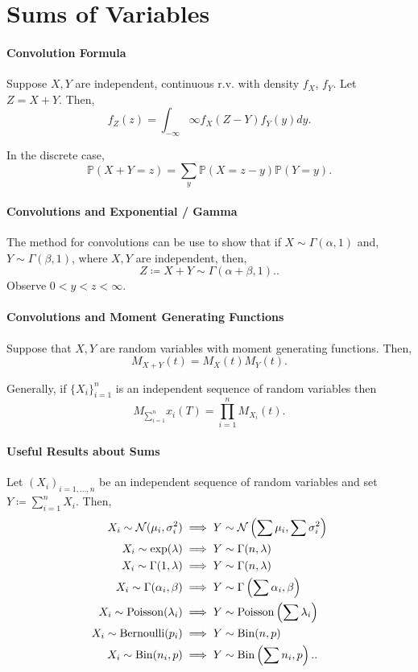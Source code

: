\section{Sums of Variables}

\paragraph{Convolution Formula}
Suppose \( X, Y \) are independent, continuous r.v. with density  \( f_X \),
\( f_Y \). Let \( Z = X + Y \). Then,  \[
    f_Z(z) = \int_{-\infty}{\infty} f_X(Z - Y) f_Y(y) dy
.\]

In the discrete case, \[
    \mathbb{P}(X + Y = z) = \sum_{y} \mathbb{P}(X = z - y) \mathbb{P}(Y = y)
.\]

\paragraph{Convolutions and Exponential / Gamma}
The method for convolutions can be use to show that if
\( X \sim \Gamma(\alpha , 1) \) and, \( Y \sim \Gamma(\beta, 1) \),
where \( X, Y \) are independent, then, \[
    Z \coloneqq X + Y \sim \Gamma(\alpha  + \beta, 1).
.\]
Observe \( 0 < y < z < \infty \).

\paragraph{Convolutions and Moment Generating Functions}
Suppose that \( X, Y \) are random variables with moment
generating functions. Then, \[
    M_{X + Y}(t) = M_X(t) M_Y(t)
.\]

Generally, if \( \{X_i\}_{i=1}^n  \) is an independent sequence of random variables
then  \[
    M_{\sum_{i=1}^n} x_i (T) = \prod_{i=1}^n M_{X_i} (t)
.\]

\paragraph{Useful Results about Sums}
Let \( (X_i)_{i = 1, \ldots, n} \) be an independent sequence of random
variables and set \( Y \coloneqq \sum_{i=1}^{n} X_i \).
Then,
\begin{align*}
    X_i \sim \mathcal{N}(\mu_i, \sigma_i^2)
        &\implies Y \sim \mathcal{N} \left( \sum \mu_i, \sum \sigma_i^2 \right) \\
    X_i \sim \exp(\lambda)
        &\implies Y \sim \Gamma(n, \lambda) \\
    X_i \sim \Gamma(1, \lambda)
        &\implies Y \sim \Gamma(n, \lambda) \\
    X_i \sim \Gamma(\alpha_i, \beta)
        &\implies Y \sim \Gamma\left(\sum \alpha_i, \beta \right) \\
    X_i \sim \mathrm{Poisson}(\lambda_i)
        &\implies Y \sim \mathrm{Poisson}\left(\sum \lambda_i\right) \\
    X_i \sim \mathrm{Bernoulli}(p_i)
        &\implies Y \sim \mathrm{Bin}(n, p) \\
    X_i \sim \mathrm{Bin}(n_i, p)
        &\implies Y \sim \mathrm{Bin}\left(\sum n_i, p\right).
.\end{align*}

